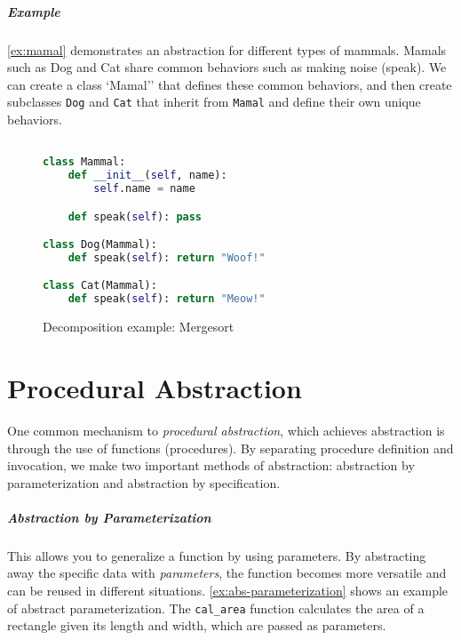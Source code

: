 \documentclass[oneside,11pt,dvipsnames]{book}
\begin{document}
\paragraph{Example} \autoref{ex:mamal} demonstrates an abstraction for different types of mammals. Mamals such as Dog and Cat share common behaviors such as making noise (speak). We can create a class `Mamal'' that defines these common behaviors, and then create subclasses \texttt{Dog} and \texttt{Cat} that inherit from \texttt{Mamal} and define their own unique behaviors.

\begin{figure}[t]
\begin{lstlisting}[multicols=2, language=Python, keywordstyle=\color{blue}, commentstyle=\color{green!60!black}, stringstyle=\color{red}, basicstyle=\ttfamily\scriptsize]

class Mammal:
    def __init__(self, name):
        self.name = name

    def speak(self): pass

class Dog(Mammal):
    def speak(self): return "Woof!"

class Cat(Mammal):
    def speak(self): return "Meow!"
\end{lstlisting}
 \caption{Decomposition example: Mergesort}\label{ex:mamal}
\end{figure}

\chapter{Procedural Abstraction}
One common mechanism to \emph{procedural abstraction}, which achieves abstraction is through the use of functions (procedures). By separating procedure definition and invocation, we make two important methods of abstraction: abstraction by parameterization and abstraction by specification.

\paragraph{Abstraction by Parameterization}

This allows you to generalize a function by using parameters. By abstracting away the specific data with \emph{parameters}, the function becomes more versatile and can be reused in different situations. \autoref{ex:abs-parameterization} shows an example of abstract parameterization. The \texttt{cal\_area} function calculates the area of a rectangle given its length and width, which are passed as parameters.
\end{document}
